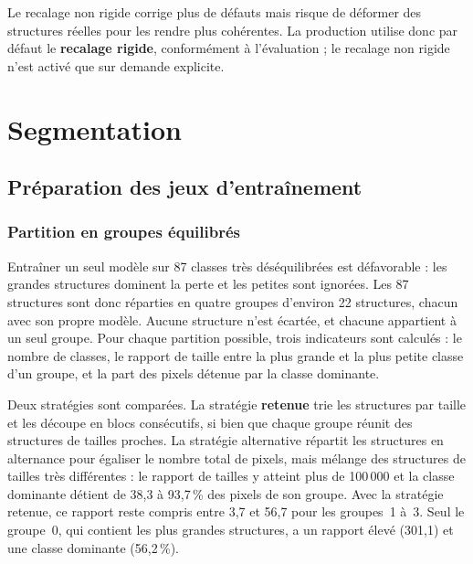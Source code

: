\documentclass[12pt,a4paper]{report}
\begin{document}
Le recalage non rigide corrige plus de défauts mais risque de déformer des structures réelles pour les rendre plus cohérentes. La production utilise donc par défaut le \textbf{recalage rigide}, conformément à l'évaluation ; le recalage non rigide n'est activé que sur demande explicite.

\chapter{Segmentation}\label{ch:seg}

\section{Préparation des jeux d'entraînement}

\subsection{Partition en groupes équilibrés}

Entraîner un seul modèle sur 87 classes très déséquilibrées est défavorable : les grandes structures dominent la perte et les petites sont ignorées. Les 87 structures sont donc réparties en quatre groupes d'environ 22 structures, chacun avec son propre modèle. Aucune structure n'est écartée, et chacune appartient à un seul groupe. Pour chaque partition possible, trois indicateurs sont calculés : le nombre de classes, le rapport de taille entre la plus grande et la plus petite classe d'un groupe, et la part des pixels détenue par la classe dominante.

Deux stratégies sont comparées. La stratégie \textbf{retenue} trie les structures par taille et les découpe en blocs consécutifs, si bien que chaque groupe réunit des structures de tailles proches. La stratégie alternative répartit les structures en alternance pour égaliser le nombre total de pixels, mais mélange des structures de tailles très différentes : le rapport de tailles y atteint plus de 100\,000 et la classe dominante détient de 38,3 à 93,7\,\% des pixels de son groupe. Avec la stratégie retenue, ce rapport reste compris entre 3,7 et 56,7 pour les groupes~1 à~3. Seul le groupe~0, qui contient les plus grandes structures, a un rapport élevé (301,1) et une classe dominante (56,2\,\%).
\end{document}
